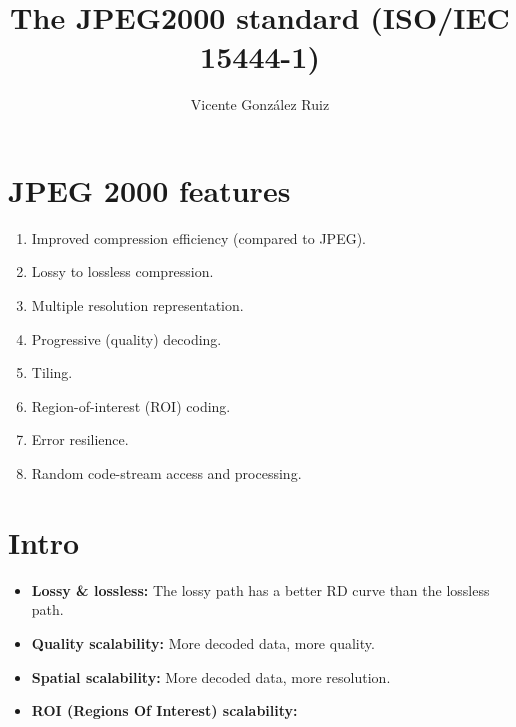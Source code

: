 \title{The JPEG2000 standard (ISO/IEC 15444-1)}
\author{Vicente González Ruiz}
\maketitle
\tableofcontents

\section{JPEG 2000 features~\cite{rabbani2009jpeg}}
\begin{enumerate}
\item Improved compression efficiency (compared to JPEG).
\item Lossy to lossless compression.
\item Multiple resolution representation.
\item Progressive (quality) decoding.
\item Tiling.
\item Region-of-interest (ROI) coding.
\item Error resilience.
\item Random code-stream access and processing.
\end{enumerate}

\section{Intro~\cite{2002.taubman}}
\begin{itemize}
\item \textbf{Lossy \& lossless:} The lossy path has a better RD curve
  than the lossless path.
  \begin{center}
  \end{center}
\item \textbf{Quality scalability:} More decoded data, more quality.
  \begin{center}
  \end{center}
  
\item \textbf{Spatial scalability:} More decoded data, more
  resolution.
  \begin{center}
  \end{center}

\item \textbf{ROI (Regions Of Interest) scalability:}
  \begin{center}
  \end{center}

\end{itemize}

